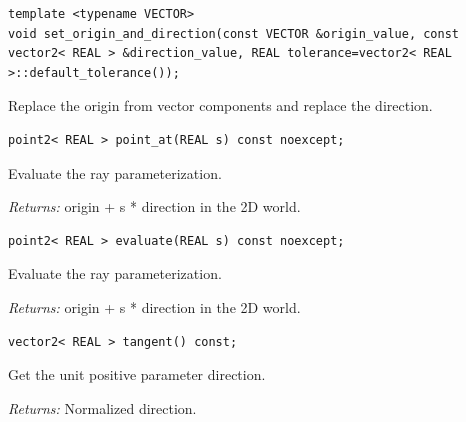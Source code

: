 \par\noindent\begin{minipage}{\linewidth}
\begin{lstlisting}[style=apireference]
template <typename VECTOR>
void set_origin_and_direction(const VECTOR &origin_value, const vector2< REAL > &direction_value, REAL tolerance=vector2< REAL >::default_tolerance());
\end{lstlisting}
{\footnotesize Replace the origin from vector components and replace the direction.\par}
\end{minipage}\par\vspace{1pt}
\par\noindent\begin{minipage}{\linewidth}
\begin{lstlisting}[style=apireference]
point2< REAL > point_at(REAL s) const noexcept;
\end{lstlisting}
{\footnotesize Evaluate the ray parameterization.\par}
{\footnotesize\textit{Returns:} origin + s * direction in the 2D world.\par}
\end{minipage}\par\vspace{1pt}
\par\noindent\begin{minipage}{\linewidth}
\begin{lstlisting}[style=apireference]
point2< REAL > evaluate(REAL s) const noexcept;
\end{lstlisting}
{\footnotesize Evaluate the ray parameterization.\par}
{\footnotesize\textit{Returns:} origin + s * direction in the 2D world.\par}
\end{minipage}\par\vspace{1pt}
\par\noindent\begin{minipage}{\linewidth}
\begin{lstlisting}[style=apireference]
vector2< REAL > tangent() const;
\end{lstlisting}
{\footnotesize Get the unit positive parameter direction.\par}
{\footnotesize\textit{Returns:} Normalized direction.\par}
\end{minipage}\par\vspace{1pt}
